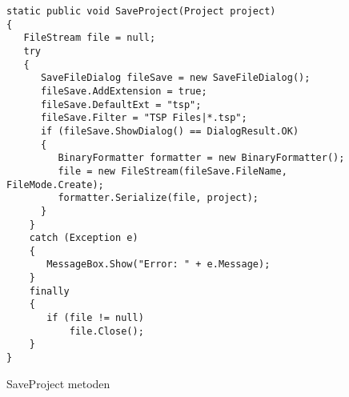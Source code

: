 \begin{figure}[H]
\begin{lstlisting}
static public void SaveProject(Project project)
{ 
   FileStream file = null;
   try
   {
      SaveFileDialog fileSave = new SaveFileDialog();
      fileSave.AddExtension = true;
      fileSave.DefaultExt = "tsp";
      fileSave.Filter = "TSP Files|*.tsp";
      if (fileSave.ShowDialog() == DialogResult.OK)
      {
         BinaryFormatter formatter = new BinaryFormatter();
         file = new FileStream(fileSave.FileName, FileMode.Create);
         formatter.Serialize(file, project);
      }
    }
    catch (Exception e)
    {
       MessageBox.Show("Error: " + e.Message);
    }
    finally
    {
       if (file != null)
           file.Close();
    }
}
\end{lstlisting}
\caption{SaveProject metoden}\label{SaveProjectCode}
\end{figure}